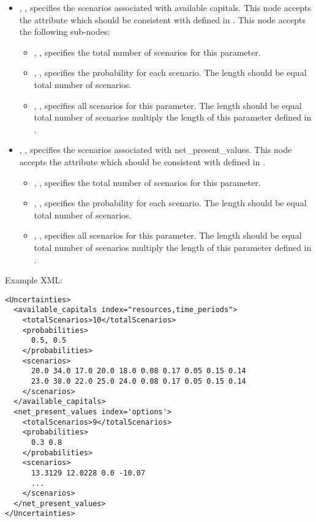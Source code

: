 \begin{itemize}
  \item {}, , specifies the scenarios
  associated with available capitals. This node accepts the attribute  which
  should be consistent with  defined in .
  This node accepts the following sub-nodes:
  \begin{itemize}
    \item {}, , specifies the total
    number of scenarios for this parameter.
    \item {}, ,
    specifies the probability for each scenario. The length should be equal total number of
    scenarios.
    \item {}, ,
    specifies all scenarios for this parameter. The length should be equal total number
    of scenarios multiply the length of this parameter defined in .
  \end{itemize}

  \item {}, , specifies the scenarios
  associated with net\_present\_values. This node accepts the attribute  which
  should be consistent with  defined in .
  \begin{itemize}
    \item {}, , specifies the total
    number of scenarios for this parameter.
    \item {}, ,
    specifies the probability for each scenario. The length should be equal total number of
    scenarios.
    \item {}, ,
    specifies all scenarios for this parameter. The length should be equal total number
    of scenarios multiply the length of this parameter defined in .
  \end{itemize}
\end{itemize}

Example XML:
\begin{lstlisting}[style=XML]
<Uncertainties>
  <available_capitals index="resources,time_periods">
    <totalScenarios>10</totalScenarios>
    <probabilities>
      0.5, 0.5
    </probabilities>
    <scenarios>
      20.0 34.0 17.0 20.0 18.0 0.08 0.17 0.05 0.15 0.14
      23.0 38.0 22.0 25.0 24.0 0.08 0.17 0.05 0.15 0.14
    </scenarios>
  </available_capitals>
  <net_present_values index='options'>
    <totalScenarios>9</totalScenarios>
    <probabilities>
      0.3 0.8
    </probabilities>
    <scenarios>
      13.3129 12.0228 0.0 -10.07
      ...
    </scenarios>
  </net_present_values>
</Uncertainties>
\end{lstlisting}


